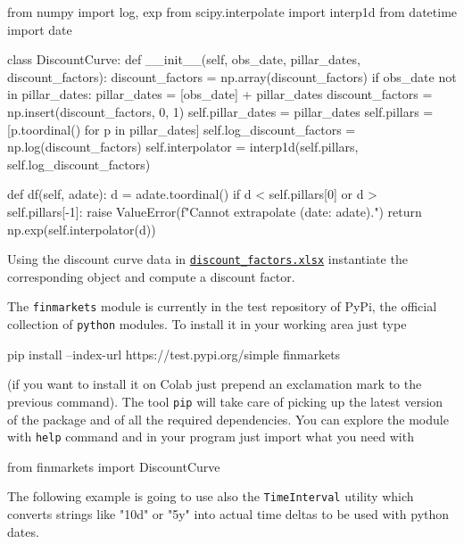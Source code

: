 \begin{ipython}
from numpy import log, exp
from scipy.interpolate import interp1d
from datetime import date

class DiscountCurve:
    def __init__(self, obs_date, pillar_dates, discount_factors):
        discount_factors = np.array(discount_factors)
        if obs_date not in pillar_dates:
            pillar_dates = [obs_date] + pillar_dates
            discount_factors = np.insert(discount_factors, 0, 1)
        self.pillar_dates = pillar_dates
        self.pillars = [p.toordinal() for p in pillar_dates] 
        self.log_discount_factors = np.log(discount_factors)
        self.interpolator = interp1d(self.pillars, self.log_discount_factors)
        
    def df(self, adate):
        d = adate.toordinal()
        if d < self.pillars[0] or d > self.pillars[-1]:
            raise ValueError(f"Cannot extrapolate (date: {adate}).")
        return np.exp(self.interpolator(d))
\end{ipython}

Using the discount curve data in \href{https://github.com/matteosan1/finance_course/raw/master/input_files/discount_factors_2022-10-05.xlsx}{\texttt{discount\_factors.xlsx}} instantiate the corresponding object and compute a discount factor.

\begin{finmarkets}
The \texttt{finmarkets} module is currently in the test repository of PyPi, the official collection of \texttt{python} modules. 
To install it in your working area just type 

\begin{ioutput}
pip install --index-url https://test.pypi.org/simple finmarkets
\end{ioutput}

(if you want to install it on Colab just prepend an exclamation mark to the previous command). The tool \texttt{pip} will take care of picking up the latest version of the package and of all the required dependencies. You can explore the module with \texttt{help} command and in your program just import what you need with

\begin{ipython}
from finmarkets import DiscountCurve
\end{ipython}
\end{finmarkets}

The following example is going to use also the \texttt{TimeInterval} utility which converts strings like "10d" or "5y" into actual time deltas to be used with python dates.

